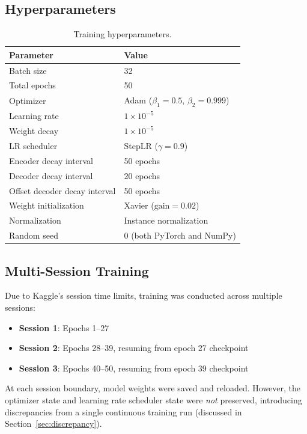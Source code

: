 \documentclass[12pt,a4paper]{article}
\begin{document}
\subsection{Hyperparameters}

\begin{table}[H]
\centering
\caption{Training hyperparameters.}
\label{tab:hyperparams}
\begin{tabular}{@{}ll@{}}
\toprule
\textbf{Parameter} & \textbf{Value} \\
\midrule
Batch size & 32 \\
Total epochs & 50 \\
Optimizer & Adam ($\beta_1 = 0.5$, $\beta_2 = 0.999$) \\
Learning rate & $1 \times 10^{-5}$ \\
Weight decay & $1 \times 10^{-5}$ \\
LR scheduler & StepLR ($\gamma = 0.9$) \\
\quad Encoder decay interval & 50 epochs \\
\quad Decoder decay interval & 20 epochs \\
\quad Offset decoder decay interval & 50 epochs \\
Weight initialization & Xavier ($\text{gain} = 0.02$) \\
Normalization & Instance normalization \\
Random seed & 0 (both PyTorch and NumPy) \\
\bottomrule
\end{tabular}
\end{table}

\subsection{Multi-Session Training}

Due to Kaggle's session time limits, training was conducted across multiple sessions:

\begin{itemize}[nosep]
    \item \textbf{Session 1}: Epochs 1--27
    \item \textbf{Session 2}: Epochs 28--39, resuming from epoch 27 checkpoint
    \item \textbf{Session 3}: Epochs 40--50, resuming from epoch 39 checkpoint
\end{itemize}

At each session boundary, model weights were saved and reloaded. However, the optimizer state and learning rate scheduler state were \emph{not} preserved, introducing discrepancies from a single continuous training run (discussed in Section~\ref{sec:discrepancy}).
\end{document}
